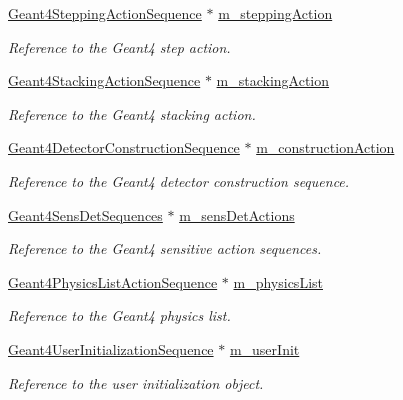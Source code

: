 \begin{DoxyCompactItemize}
\hyperlink{class_d_d4hep_1_1_simulation_1_1_geant4_stepping_action_sequence}{Geant4\+Stepping\+Action\+Sequence} $\ast$ \hyperlink{class_d_d4hep_1_1_simulation_1_1_geant4_action_container_a45d1b85f3238c5658fef9a0170c40ae1}{m\+\_\+stepping\+Action}
\begin{DoxyCompactList}\small\item\em Reference to the Geant4 step action. \end{DoxyCompactList}\item 
\hyperlink{class_d_d4hep_1_1_simulation_1_1_geant4_stacking_action_sequence}{Geant4\+Stacking\+Action\+Sequence} $\ast$ \hyperlink{class_d_d4hep_1_1_simulation_1_1_geant4_action_container_a2fafe23afaf2000c04de123052b7e785}{m\+\_\+stacking\+Action}
\begin{DoxyCompactList}\small\item\em Reference to the Geant4 stacking action. \end{DoxyCompactList}\item 
\hyperlink{class_d_d4hep_1_1_simulation_1_1_geant4_detector_construction_sequence}{Geant4\+Detector\+Construction\+Sequence} $\ast$ \hyperlink{class_d_d4hep_1_1_simulation_1_1_geant4_action_container_a98e2929884380e696c80a9c50c072afe}{m\+\_\+construction\+Action}
\begin{DoxyCompactList}\small\item\em Reference to the Geant4 detector construction sequence. \end{DoxyCompactList}\item 
\hyperlink{class_d_d4hep_1_1_simulation_1_1_geant4_sens_det_sequences}{Geant4\+Sens\+Det\+Sequences} $\ast$ \hyperlink{class_d_d4hep_1_1_simulation_1_1_geant4_action_container_ae9a092ff4aa75024c19b392f227abdef}{m\+\_\+sens\+Det\+Actions}
\begin{DoxyCompactList}\small\item\em Reference to the Geant4 sensitive action sequences. \end{DoxyCompactList}\item 
\hyperlink{class_d_d4hep_1_1_simulation_1_1_geant4_physics_list_action_sequence}{Geant4\+Physics\+List\+Action\+Sequence} $\ast$ \hyperlink{class_d_d4hep_1_1_simulation_1_1_geant4_action_container_a8cd72bfb49bd3d62e899591ae65fe7dd}{m\+\_\+physics\+List}
\begin{DoxyCompactList}\small\item\em Reference to the Geant4 physics list. \end{DoxyCompactList}\item 
\hyperlink{class_d_d4hep_1_1_simulation_1_1_geant4_user_initialization_sequence}{Geant4\+User\+Initialization\+Sequence} $\ast$ \hyperlink{class_d_d4hep_1_1_simulation_1_1_geant4_action_container_a921172979d5e4b7be0b166f47b67d6fd}{m\+\_\+user\+Init}
\begin{DoxyCompactList}\small\item\em Reference to the user initialization object. \end{DoxyCompactList}\end{DoxyCompactItemize}


